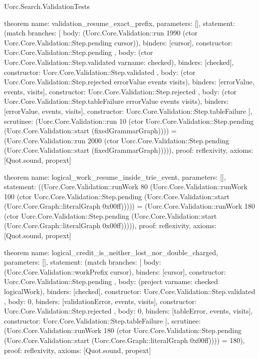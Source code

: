 \begin{lexlean}{Uorc.Search.ValidationTests}
\begin{semanticmodule}
theorem{
  name: validation_resume_exact_prefix,
  parameters: [],
  statement: (match{
    branches: [
      {
        body: (Uorc.Core.Validation::run 1990 (ctor Uorc.Core.Validation::Step.pending cursor)),
        binders: [cursor],
        constructor: Uorc.Core.Validation::Step.pending
      },
      {
        body: (ctor Uorc.Core.Validation::Step.validated var{name: checked}),
        binders: [checked],
        constructor: Uorc.Core.Validation::Step.validated
      },
      {
        body: (ctor Uorc.Core.Validation::Step.rejected errorValue events visits),
        binders: [errorValue, events, visits],
        constructor: Uorc.Core.Validation::Step.rejected
      },
      {
        body: (ctor Uorc.Core.Validation::Step.tableFailure errorValue events visits),
        binders: [errorValue, events, visits],
        constructor: Uorc.Core.Validation::Step.tableFailure
      }
    ],
    scrutinee: (Uorc.Core.Validation::run 10 (ctor Uorc.Core.Validation::Step.pending (Uorc.Core.Validation::start (fixedGrammarGraph))))
  } = (Uorc.Core.Validation::run 2000 (ctor Uorc.Core.Validation::Step.pending (Uorc.Core.Validation::start (fixedGrammarGraph))))),
  proof: reflexivity{},
  axioms: [Quot.sound, propext]
}

theorem{
  name: logical_work_resume_inside_trie_event,
  parameters: [],
  statement: ((Uorc.Core.Validation::runWork 80 (Uorc.Core.Validation::runWork 100 (ctor Uorc.Core.Validation::Step.pending (Uorc.Core.Validation::start (Uorc.Core.Graph::literalGraph 0x00ff))))) = (Uorc.Core.Validation::runWork 180 (ctor Uorc.Core.Validation::Step.pending (Uorc.Core.Validation::start (Uorc.Core.Graph::literalGraph 0x00ff))))),
  proof: reflexivity{},
  axioms: [Quot.sound, propext]
}

theorem{
  name: logical_credit_is_neither_lost_nor_double_charged,
  parameters: [],
  statement: (match{
    branches: [
      {
        body: (Uorc.Core.Validation::workPrefix cursor),
        binders: [cursor],
        constructor: Uorc.Core.Validation::Step.pending
      },
      {
        body: (project var{name: checked} logicalWork),
        binders: [checked],
        constructor: Uorc.Core.Validation::Step.validated
      },
      {
        body: 0,
        binders: [validationError, events, visits],
        constructor: Uorc.Core.Validation::Step.rejected
      },
      {
        body: 0,
        binders: [tableError, events, visits],
        constructor: Uorc.Core.Validation::Step.tableFailure
      }
    ],
    scrutinee: (Uorc.Core.Validation::runWork 180 (ctor Uorc.Core.Validation::Step.pending (Uorc.Core.Validation::start (Uorc.Core.Graph::literalGraph 0x00ff))))
  } = 180),
  proof: reflexivity{},
  axioms: [Quot.sound, propext]
}


\end{semanticmodule}
\end{lexlean}

